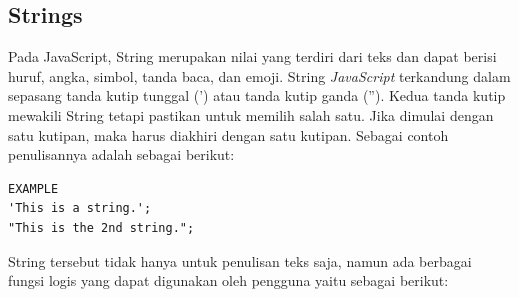 \subsection{Strings}
\label{sec: Strings}
    Pada JavaScript, String merupakan nilai yang terdiri dari teks dan dapat berisi huruf, angka, simbol, tanda baca, dan emoji\cite{javascriptlearn}. String \textit{JavaScript} terkandung dalam sepasang tanda kutip tunggal (') atau tanda kutip ganda (''). Kedua tanda kutip mewakili String tetapi pastikan untuk memilih salah satu. Jika dimulai dengan satu kutipan, maka harus diakhiri dengan satu kutipan. Sebagai contoh penulisannya adalah sebagai berikut:
    \begin{lstlisting}[basicstyle=\ttfamily, frame=single,
    columns=fullflexible, breaklines=true, numbers=none]
EXAMPLE
'This is a string.';
"This is the 2nd string.";
    \end{lstlisting}
    String tersebut tidak hanya untuk penulisan teks saja, namun ada berbagai fungsi logis yang dapat digunakan oleh pengguna yaitu sebagai berikut: 
